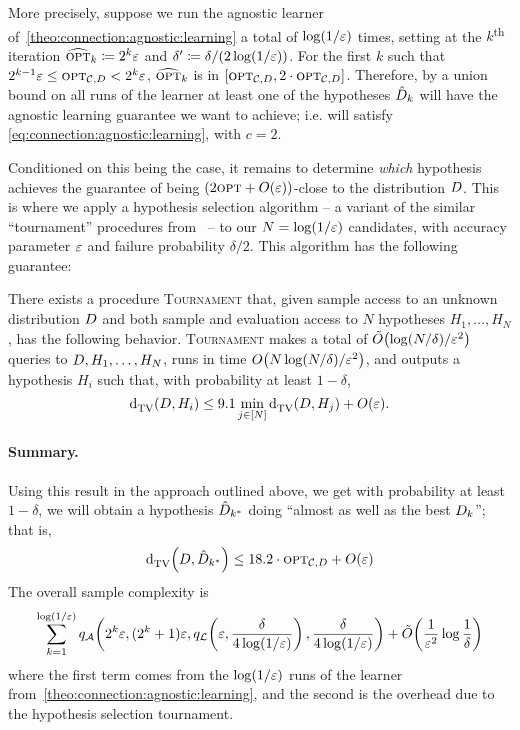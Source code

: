 More precisely, suppose we run the agnostic learner of~\cref{theo:connection:agnostic:learning} a total of $\log(1/\varepsilon)$ times, setting at the $k$\textsuperscript{th} iteration $\widehat{{\textsc{opt}}}_k\coloneqq 2^k\varepsilon$ and $\delta^\prime\coloneqq \delta/(2\log(1/\varepsilon))$. For the first $k$ such that $2^{k-1}\varepsilon \leq {\textsc{opt}}_{\mathcal{C},D} < 2^k\varepsilon$, $\widehat{{\textsc{opt}}}_k$ is in $[{\textsc{opt}}_{\mathcal{C},D}, 2\cdot {\textsc{opt}}_{\mathcal{C},D}]$. Therefore, by a union bound on all runs of the learner at least one of the hypotheses $\hat{D}_k$ will have the agnostic learning guarantee we want to achieve; i.e. will satisfy \eqref{eq:connection:agnostic:learning}, with $c=2$.

Conditioned on this being the case, it remains to determine \emph{which} hypothesis achieves the guarantee of being $(2\opt+\bigO{\eps})$-close to the distribution $D$. This is where 
we apply a hypothesis selection algorithm -- a variant of the similar ``tournament'' procedures from~\cite{DL:01,DK:13,AJOS:14:ISIT} -- to our $N=\log(1/\varepsilon)$ candidates, 
with accuracy parameter $\varepsilon$ and failure probability $\delta/2$. This algorithm has the following guarantee:
\begin{proposition}[\cite{CK:15}]\label{prop:tournament}
  There exists a procedure \textsc{Tournament} that, given sample access to an unknown distribution $D$ and both sample and evaluation access to $N$ hypotheses $H_1,\dots,H_N$, has the following behavior. \textsc{Tournament} makes a total of $\tildeO{{\log(N/\delta)}/{\eps^2}}$ queries to $D,H_1,\dots,H_N$, runs in time $\bigO{{N\log(N/\delta)}/{\eps^2}}$, and outputs a hypothesis $H_i$ such that, with probability at least $1-\delta$,
  \[
      \totalvardist{\D}{H_i} \leq 9.1 \min_{j\in[N] } \totalvardist{\D}{H_j} + \bigO{\eps}.
  \]
\end{proposition}

\paragraph{Summary.} Using this result in the approach outlined above, we get with probability at least $1-\delta$, we will obtain a hypothesis $\hat{D}_{k^\ast}$ doing ``almost as well as the best $D_k$''; that is,
\[
	\totalvardist{ \D }{ \hat{\D}_{k^\ast} } \leq 18.2\cdot \opt_{\class,\D} + \bigO{\eps}
\]
The overall sample complexity is
\[
	\sum_{k=1}^{\log(1/\eps)}q_\Algo\!\left(2^k\eps,(2^{k}+1)\eps, q_\Learner\!\left(\eps,\frac{\delta}{4\log(1/\eps)}\right),\frac{\delta}{4\log(1/\eps)}\right) + \tildeO{ \frac{1}{\eps^2}\log\frac{1}{\delta} } 
\]
where the first term comes from the $\log(1/\varepsilon)$ runs of the learner from~\cref{theo:connection:agnostic:learning}, and the second is the overhead due to the hypothesis selection tournament.





